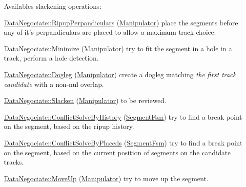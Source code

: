 Availables slackening operations\-:
\begin{DoxyEnumerate}
\item \hyperlink{classKite_1_1DataNegociate_ab7ccb6fc1f298728995250a3bbcf18c7a19d8d157762b2b73c5274e4865523d29}{Data\-Negociate\-::\-Ripup\-Perpandiculars} (\hyperlink{classKite_1_1Manipulator}{Manipulator}) place the segments before any of it's perpandiculars are placed to allow a maximum track choice.
\item \hyperlink{classKite_1_1DataNegociate_ab7ccb6fc1f298728995250a3bbcf18c7a548e204a4e2ffae50774910737f11380}{Data\-Negociate\-::\-Minimize} (\hyperlink{classKite_1_1Manipulator}{Manipulator}) try to fit the segment in a hole in a track, perform a hole detection.
\item \hyperlink{classKite_1_1DataNegociate_ab7ccb6fc1f298728995250a3bbcf18c7a361bca46d5e7bdf02f50f7ecaa6018a9}{Data\-Negociate\-::\-Dogleg} (\hyperlink{classKite_1_1Manipulator}{Manipulator}) create a dogleg matching {\itshape the first track candidate} with a non-\/nul overlap.
\item \hyperlink{classKite_1_1DataNegociate_ab7ccb6fc1f298728995250a3bbcf18c7a0d4bff02b3163821c0e5f7ad9dd55f36}{Data\-Negociate\-::\-Slacken} (\hyperlink{classKite_1_1Manipulator}{Manipulator}) to be reviewed.
\item \hyperlink{classKite_1_1DataNegociate_ab7ccb6fc1f298728995250a3bbcf18c7ae08187cba35efd6229ab8acfd003a600}{Data\-Negociate\-::\-Conflict\-Solve\-By\-History} (\hyperlink{classKite_1_1SegmentFsm}{Segment\-Fsm}) try to find a break point on the segment, based on the ripup history.
\item \hyperlink{classKite_1_1DataNegociate_ab7ccb6fc1f298728995250a3bbcf18c7afce071be0ba39626ed1c865789da598b}{Data\-Negociate\-::\-Conflict\-Solve\-By\-Placeds} (\hyperlink{classKite_1_1SegmentFsm}{Segment\-Fsm}) try to find a break point on the segment, based on the current position of segments on the candidate tracks.
\item \hyperlink{classKite_1_1DataNegociate_ab7ccb6fc1f298728995250a3bbcf18c7adfd76a7d65b56ed7ecc0eedf921d6f82}{Data\-Negociate\-::\-Move\-Up} (\hyperlink{classKite_1_1Manipulator}{Manipulator}) try to move up the segment.
\end{DoxyEnumerate}

